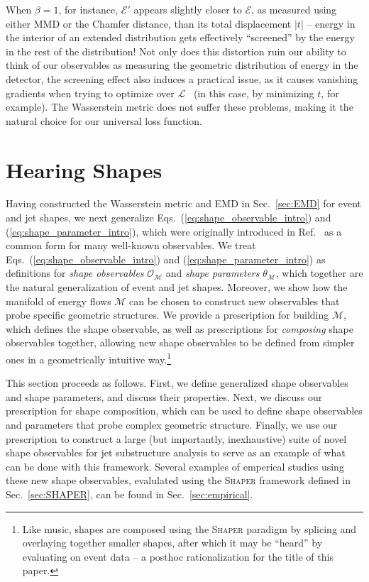 \documentclass[letterpaper,11pt]{article}
\newcommand{\E}{\mathcal{E}}
\newcommand{\M}{\mathcal{M}}
\renewcommand{\O}{\mathcal{O}}
\DeclareRobustCommand{\Sec}[1]{Sec.~\ref{sec:#1}}
\DeclareRobustCommand{\Eqs}[2]{Eqs.~(\ref{eq:#1}) and (\ref{eq:#2})}
\DeclareRobustCommand{\Refer}[1]{Ref.~\cite{#1}}
\newcommand{\Shaper}{\textsc{Shaper}\xspace}
\begin{document}
%
When $\beta = 1$, for instance, $\E'$ appears slightly closer to $\E$, as measured using either MMD or the Chamfer distance, than its total displacement $|t|$ -- energy in the interior of an extended distribution gets effectively ``screened'' by the energy in the rest of the distribution!
%
Not only does this distortion ruin our ability to think of our observables as measuring the geometric distribution of energy in the detector, the screening effect also induces a practical issue, as it causes vanishing gradients when trying to optimize over $\mathcal{L}$~\cite{feydy2019interpolating} (in this case, by minimizing $t$, for example). 
%
The Wasserstein metric does not suffer these problems, making it the natural choice for our universal loss function.





\section{Hearing Shapes} \label{sec:hearing}

Having constructed the Wasserstein metric and EMD in \Sec{EMD} for event and jet shapes, we next generalize \Eqs{shape_observable_intro}{shape_parameter_intro}, which were originally introduced in \Refer{2020} as a common form for many well-known observables. 
%
We treat \Eqs{shape_observable_intro}{shape_parameter_intro} as definitions for \emph{shape observables} $\O_\M$ and \emph{shape parameters} $\theta_\M$, which together are the natural generalization of event and jet shapes.
%
Moreover, we show how the manifold of energy flows $\M$ can be chosen to construct new observables that probe specific geometric structures.
%
We provide a prescription for building $\M$, which defines the shape observable, as well as prescriptions for \emph{composing} shape observables together, allowing new shape observables to be defined from simpler ones in a geometrically intuitive way.\footnote{Like music, shapes are composed using the \Shaper paradigm by splicing and overlaying together smaller shapes, after which it may be ``heard'' by evaluating on event data -- a posthoc rationalization for the title of this paper.} 

This section proceeds as follows.
%
First, we define generalized shape observables and shape parameters, and discuss their properties. 
%
Next, we discuss our prescription for shape composition, which can be used to define shape observables and parameters that probe complex geometric structure.
%
Finally, we use our prescription to construct a large (but importantly, inexhaustive) suite of novel shape observables for jet substructure analysis to serve as an example of what can be done with this framework.
%
Several examples of emperical studies using these new shape observables, evalulated using the \Shaper framework defined in \Sec{SHAPER}, can be found in \Sec{empirical}.
\end{document}
